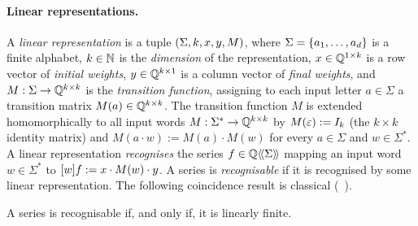 \paragraph{Linear representations.}

A \emph{linear representation} is a tuple $(\Sigma, k, x, y, M)$,
where $\Sigma = \left\{a_1, \dots, a_d\right\}$ is a finite alphabet,
$k \in \mathbb N$ is the \emph{dimension} of the representation,
$x \in \mathbb Q^{1 \times k}$ is a row vector of \emph{initial weights},
$y \in \mathbb Q^{k \times 1}$ is a column vector of \emph{final weights},
and $M : \Sigma \to \mathbb Q^{k \times k}$ is the \emph{transition function},
assigning to each input letter $a \in \Sigma$ a transition matrix $M(a) \in \mathbb Q^{k \times k}$.
%
The transition function $M$ is extended homomorphically to all input words $M : \Sigma^* \to \mathbb Q^{k \times k}$
by $M(\varepsilon) := I_k$ (the $k \times k$ identity matrix)
and $M(a \cdot w) := M(a) \cdot M(w)$ for every $a \in \Sigma$ and $w \in \Sigma^*$.
%
A linear representation \emph{recognises} the series $f \in \mathbb Q\langle\!\langle\Sigma\rangle\!\rangle$
mapping an input word $w \in \Sigma^*$ to $[w]f := x \cdot M(w) \cdot y$.
%
A series is \emph{recognisable} if it is recognised by some linear representation.
%
The following coincidence result is classical (\cf~\cite[Proposition~5.1]{BerstelReutenauer:CUP:2010}).
%
\begin{lemma}
    A series is recognisable if, and only if, it is linearly finite.
\end{lemma}
%
%
